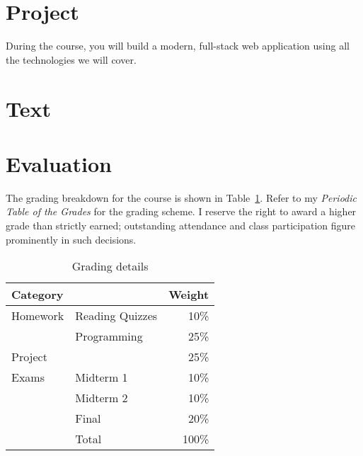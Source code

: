 \documentclass[11pt]{article}
\begin{document}
\section{Project}

During the course,
you will build a modern, full-stack web application
using all the technologies we will cover.

\section{Text}



\section{Evaluation}

The grading breakdown for the course
is shown in Table~\ref{tab:grading}.
Refer to my \emph{Periodic Table of the Grades}
for the grading scheme.
I reserve the right to award a higher grade than strictly earned;
outstanding attendance and class participation
figure prominently in such decisions.

\begin{table}[htb]
  \centering
\begin{tabular}{llr}
\toprule
Category &                 & Weight \\
\midrule
Homework & Reading Quizzes & 10\%   \\
         & Programming     & 25\%   \\
Project  &                 & 25\%   \\
Exams    & Midterm 1       & 10\%   \\
         & Midterm 2       & 10\%   \\
         & Final           & 20\%   \\
\midrule
         & Total           & 100\%  \\
\bottomrule
\end{tabular}
  \caption{Grading details}
  \label{tab:grading}
\end{table}
\begin{comment}
#+ORGTBL: SEND grades orgtbl-to-latex :splice nil :skip 0 :booktabs t
| Category |                 | Weight |
|          |                 |    <r> |
|----------+-----------------+--------|
| Homework | Reading Quizzes |    10%
|          | Programming     |    25%
| Project  |                 |    25%
| Exams    | Midterm 1       |    10%
|          | Midterm 2       |    10%
|          | Final           |    20%
|----------+-----------------+--------|
|          | Total           |   100%
#+TBLFM: @9$3=100*vsum(@I..II);%
\end{comment}
\end{document}
